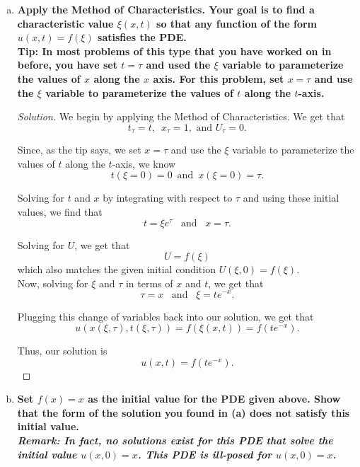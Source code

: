 \documentclass[11pt]{article}
\newenvironment{solution}
  {\renewcommand\qedsymbol{$\blacksquare$}\begin{proof}[Solution]}
  {\end{proof}}
\begin{document}
\begin{enumerate}[(a)]
    \item \textbf{Apply the Method of Characteristics. Your goal is to find a characteristic value $\xi(x, t)$ so that any function of the form $u(x, t) = f(\xi)$ satisfies the PDE.} \\
     
    \textbf{Tip: In most problems of this type that you have worked on in before, you have set $t = \tau$
    and used the $\xi$ variable to parameterize the values of $x$ along the $x$ axis. For this problem,
    set $x=\tau$ and use the $\xi$ variable to parameterize the values of $t$ along the $t$-axis.}
    
    \begin{solution}
    We begin by applying the Method of Characteristics. We get that 
    \[ t_{\tau} = t, \, \, \, x_{\tau} = 1, \text{ and } U_{\tau} = 0.\]

    Since, as the tip says, we set $x = \tau$ and use the $\xi$ variable to parameterize the values of $t$ along the $t$-axis, we know 
    \[ t(\xi = 0) = 0 \, \, \, \text{and} \, \, \, x(\xi = 0) = \tau.\]

    Solving for $t$ and $x$ by integrating with respect to $\tau$ and using these initial values, we find that 
    \[ t = \xi e^{\tau} \, \, \, \text{ and } \, \, \, x = \tau.\]

    Solving for $U$, we get that \[ U = f(\xi)\] which also matches the given initial condition $U(\xi, 0) = f(\xi).$ \\

    Now, solving for $\xi$ and $\tau$ in terms of $x$ and $t$, we get that \[ \tau = x \, \, \, \text{ and } \, \, \, \xi = te^{-x}.\]

    Plugging this change of variables back into our solution, we get that
    \[u(x(\xi, \tau), t(\xi, \tau)) = f(\xi(x, t)) = f(te^{-x}).\]

    Thus, our solution is \[\boxed{u(x, t) = f(te^{-x})}.\]
    
    \end{solution}
    \item \textbf{Set $f(x) = x$ as the initial value for the PDE given above. Show that the form of the solution you found in (a) does not satisfy this initial value. } \\
     
    \textbf{\textit{Remark: In fact, no solutions exist for this PDE that solve the initial value $u(x, 0) = x$. This PDE is ill-posed for $u(x, 0) = x$.}}


\end{enumerate}
\end{document}
